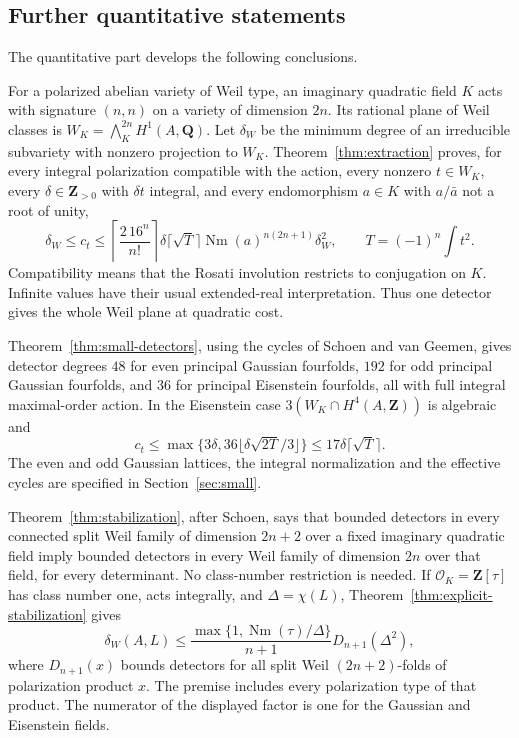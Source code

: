 \documentclass[11pt]{article}
\theoremstyle{definition}
\theoremstyle{remark}
\newcommand{\Q}{\mathbf Q}
\newcommand{\Z}{\mathbf Z}
\newcommand{\Nm}{\operatorname{Nm}}
\begin{document}
\subsection{Further quantitative statements}

The quantitative part develops the following conclusions.

For a polarized abelian variety of Weil type, an imaginary quadratic field $K$ acts with signature $(n,n)$ on a variety of dimension $2n$. Its rational plane of Weil classes is
$W_K=\bigwedge_K^{2n}H^1(A,\Q)$. Let $\delta_W$ be the minimum degree of an irreducible subvariety with nonzero projection to $W_K$. Theorem~\ref{thm:extraction} proves, for every integral polarization compatible with the action, every nonzero $t\in W_K$, every $\delta\in\Z_{>0}$ with $\delta t$ integral, and every endomorphism $a\in K$ with $a/\bar a$ not a root of unity,
\[
 \delta_W\leq c_t\leq
 \left\lceil\frac{2\,16^n}{n!}\right\rceil
 \delta\lceil\sqrt T\rceil\Nm(a)^{n(2n+1)}\delta_W^2,
 \qquad T=(-1)^n\int t^2.
\]
Compatibility means that the Rosati involution restricts to conjugation on $K$. Infinite values have their usual extended-real interpretation. Thus one detector gives the whole Weil plane at quadratic cost.

Theorem~\ref{thm:small-detectors}, using the cycles of Schoen and van Geemen, gives detector degrees $48$ for even principal Gaussian fourfolds, $192$ for odd principal Gaussian fourfolds, and $36$ for principal Eisenstein fourfolds, all with full integral maximal-order action. In the Eisenstein case $3(W_K\cap H^4(A,\Z))$ is algebraic and
\[
 c_t\leq\max\{3\delta,36\lfloor\delta\sqrt{2T}/3\rfloor\}
 \leq17\delta\lceil\sqrt T\rceil.
\]
The even and odd Gaussian lattices, the integral normalization and the effective cycles are specified in Section~\ref{sec:small}.

Theorem~\ref{thm:stabilization}, after Schoen, says that bounded detectors in every connected split Weil family of dimension $2n+2$ over a fixed imaginary quadratic field imply bounded detectors in every Weil family of dimension $2n$ over that field, for every determinant. No class-number restriction is needed. If $\mathcal O_K=\Z[\tau]$ has class number one, acts integrally, and $\Delta=\chi(L)$, Theorem~\ref{thm:explicit-stabilization} gives
\[
 \delta_W(A,L)\leq\frac{\max\{1,\Nm(\tau)/\Delta\}}{n+1}D_{n+1}(\Delta^2),
\]
where $D_{n+1}(x)$ bounds detectors for all split Weil $(2n+2)$-folds of polarization product $x$. The premise includes every polarization type of that product. The numerator of the displayed factor is one for the Gaussian and Eisenstein fields.
\end{document}
